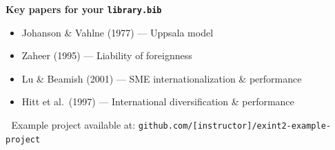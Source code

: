 \documentclass[
  letterpaper,
  DIV=11,
  numbers=noendperiod]{scrartcl}
\providecommand{\tightlist}{%
  \setlength{\itemsep}{0pt}\setlength{\parskip}{0pt}}\usepackage{longtable,booktabs,array}
\begin{document}
\textbf{Key papers for your \texttt{library.bib}}

\begin{itemize}
\tightlist
\item
  Johanson \& Vahlne (1977) --- Uppsala model
\item
  Zaheer (1995) --- Liability of foreignness\\
\item
  Lu \& Beamish (2001) --- SME internationalization \& performance
\item
  Hitt et al.~(1997) --- International diversification \& performance
\end{itemize}

📁 Example project available at:
\texttt{github.com/{[}instructor{]}/exint2-example-project}
\end{document}
